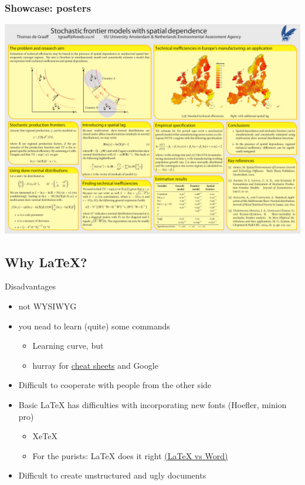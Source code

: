 \documentclass[ignorenonframetext]{beamer}
\begin{document}
\begin{frame}[fragile]
  \frametitle{Showcase: posters}
  \includegraphics[width = 1.0\textwidth]{poster}
\end{frame}

\subsection{Why \LaTeX{}?}\label{why}

\begin{frame}{Disadvantages}

\begin{itemize}
  \item not WYSIWYG \pause
  \item you nead to learn (quite) some commands
  \begin{itemize}
  \item
    Learning curve, but
  \item
    hurray for
    \href{https://wch.github.io/latexsheet/latexsheet.pdf}{cheat sheets}
    and Google\pause
  \end{itemize}
  \item Difficult to cooperate with people from the \alert{other} side \pause
\item
  \alert{Basic} \LaTeX{} has difficulties with incorporating new
  fonts (Hoefler, minion pro)
  \begin{itemize}
    \item XeTeX \item For the purists: \LaTeX{} does it right
      \href{http://oestrem.com/thingstwice/2007/05/latex-vs-word-vs-writer/}{(\LaTeX{}
      vs Word)}\pause
  \end{itemize}
  \item Difficult to create unstructured and ugly documents
\end{itemize}
\end{frame}
\end{document}
